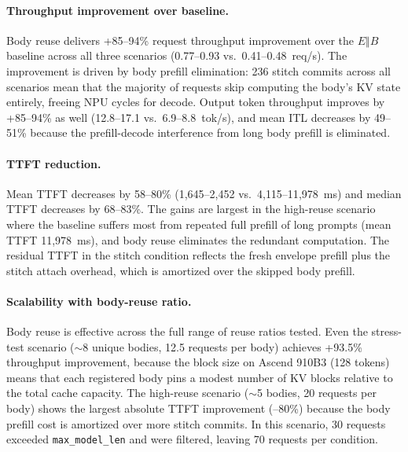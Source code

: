 \documentclass[conference]{IEEEtran}
\begin{document}
\paragraph{Throughput improvement over baseline.}
Body reuse delivers +85--94\% request throughput improvement over the $E \Vert B$ baseline across all three scenarios (0.77--0.93 vs.\ 0.41--0.48~req/s). The improvement is driven by body prefill elimination: 236 stitch commits across all scenarios mean that the majority of requests skip computing the body's KV state entirely, freeing NPU cycles for decode. Output token throughput improves by +85--94\% as well (12.8--17.1 vs.\ 6.9--8.8~tok/s), and mean ITL decreases by 49--51\% because the prefill-decode interference from long body prefill is eliminated.

\paragraph{TTFT reduction.}
Mean TTFT decreases by 58--80\% (1{,}645--2{,}452 vs.\ 4{,}115--11{,}978~ms) and median TTFT decreases by 68--83\%. The gains are largest in the high-reuse scenario where the baseline suffers most from repeated full prefill of long prompts (mean TTFT 11{,}978~ms), and body reuse eliminates the redundant computation. The residual TTFT in the stitch condition reflects the fresh envelope prefill plus the stitch attach overhead, which is amortized over the skipped body prefill.

\paragraph{Scalability with body-reuse ratio.}
Body reuse is effective across the full range of reuse ratios tested. Even the stress-test scenario ($\sim$8 unique bodies, 12.5 requests per body) achieves +93.5\% throughput improvement, because the block size on Ascend 910B3 (128 tokens) means that each registered body pins a modest number of KV blocks relative to the total cache capacity. The high-reuse scenario ($\sim$5 bodies, 20 requests per body) shows the largest absolute TTFT improvement (--80\%) because the body prefill cost is amortized over more stitch commits. In this scenario, 30 requests exceeded \texttt{max\_model\_len} and were filtered, leaving 70 requests per condition.
\end{document}
